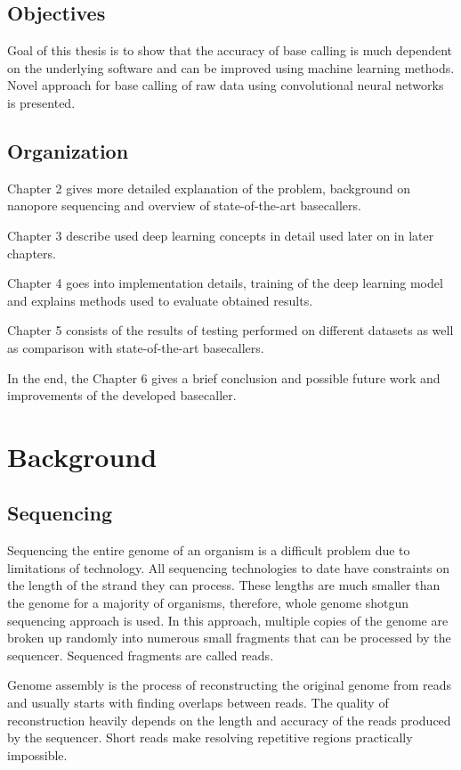 \documentclass[times, utf8, diplomski, numeric, english]{fer}
\begin{document}
\section{Objectives}
Goal of this thesis is to show that the accuracy of base calling is much dependent on the underlying software and can be improved using machine learning methods. Novel approach for base calling of raw data using convolutional neural networks is presented.
 
\section{Organization}
\indent Chapter 2 gives more detailed explanation of the problem, background on nanopore sequencing and overview of state-of-the-art basecallers.

Chapter 3 describe used deep learning concepts in detail used later on in later chapters.

Chapter 4 goes into implementation details, training of the deep learning model and explains methods used to evaluate obtained results. 

Chapter 5 consists of the results of testing performed on different datasets as well as comparison with state-of-the-art basecallers.

In the end, the Chapter 6 gives a brief conclusion and possible future work and improvements of the developed basecaller.

\chapter{Background}

\section{Sequencing}

Sequencing the entire genome of an organism is a difficult problem due to limitations of technology.
All sequencing technologies to date have constraints on the length of the strand they can process. 
These lengths are much smaller than the genome for a majority of organisms, therefore, whole genome shotgun sequencing approach is used. 
In this approach, multiple copies of the genome are broken up randomly into numerous small fragments that can be processed by the sequencer. Sequenced fragments are called reads.

Genome assembly is the process of reconstructing the original genome from reads and usually starts with finding overlaps between reads.
The quality of reconstruction heavily depends on the length and accuracy of the reads produced by the sequencer. Short reads make resolving repetitive regions practically impossible.
\end{document}
